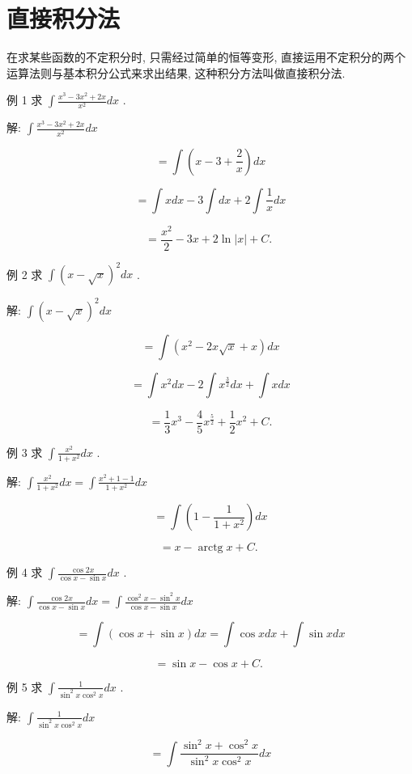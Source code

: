 \documentclass[lang=cn,newtx,10pt,scheme=chinese]{elegantbook}
\begin{document}
\section{直接积分法}

在求某些函数的不定积分时, 只需经过简单的恒等变形, 直接运用不定积分的两个运算法则与基本积分公式来求出结果, 这种积分方法叫做直接积分法.

例 1 求 \(\int \frac{{x}^{3} - 3{x}^{2} + {2x}}{{x}^{2}}{dx}\) .

解: \(\int \frac{{x}^{3} - 3{x}^{2} + {2x}}{{x}^{2}}{dx}\)

\[
= \int \left( {x - 3 + \frac{2}{x}}\right) {dx}
\]

\[
= \int {xdx} - 3\int {dx} + 2\int \frac{1}{x}{dx}
\]

\[
= \frac{{x}^{2}}{2} - {3x} + 2\ln \left| x\right| + C\text{. }
\]

例 2 求 \(\int {\left( x - \sqrt{x}\right) }^{2}{dx}\) .

解: \(\int {\left( x - \sqrt{x}\right) }^{2}{dx}\)

\[
= \int \left( {{x}^{2} - {2x}\sqrt{x} + x}\right) {dx}
\]

\[
= \int {x}^{2}{dx} - 2\int {x}^{\frac{3}{2}}{dx} + \int {xdx}
\]

\[
= \frac{1}{3}{x}^{3} - \frac{4}{5}{x}^{\frac{5}{2}} + \frac{1}{2}{x}^{2} + C.
\]

例 3 求 \(\int \frac{{x}^{2}}{1 + {x}^{2}}{dx}\) .

解: \(\int \frac{{x}^{2}}{1 + {x}^{2}}{dx} = \int \frac{{x}^{2} + 1 - 1}{1 + {x}^{2}}{dx}\)

\[
= \int \left( {1 - \frac{1}{1 + {x}^{2}}}\right) {dx}
\]

\[
= x - \operatorname{arctg}x + C\text{. }
\]

例 4 求 \(\int \frac{\cos {2x}}{\cos x - \sin x}{dx}\) .

解: \(\int \frac{\cos {2x}}{\cos x - \sin x}{dx} = \int \frac{{\cos }^{2}x - {\sin }^{2}x}{\cos x - \sin x}{dx}\)

\[
= \int \left( {\cos x + \sin x}\right) {dx} = \int \cos {xdx} + \int \sin {xdx}
\]

\[
= \sin x - \cos x + C\text{. }
\]

例 5 求 \(\int \frac{1}{{\sin }^{2}x{\cos }^{2}x}{dx}\) .

解: \(\int \frac{1}{{\sin }^{2}x{\cos }^{2}x}{dx}\)

\[
= \int \frac{{\sin }^{2}x + {\cos }^{2}x}{{\sin }^{2}x{\cos }^{2}x}{dx}
\]
\end{document}
